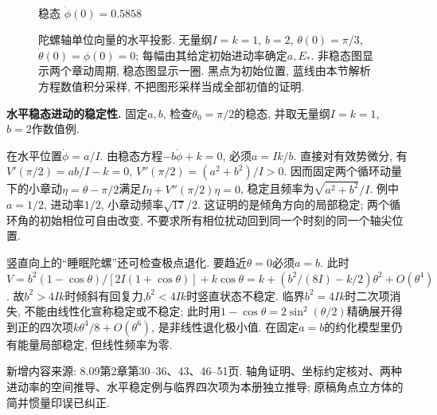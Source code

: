 \begin{figure}[htbp]
\begin{minipage}{.46\textwidth}
\\ 稳态 $\dot\phi(0)=0.5858$
\end{minipage}
\caption{陀螺轴单位向量的水平投影. 无量纲$I=k=1$, $b=2$, $\theta(0)=\pi/3$, $\dot\theta(0)=\phi(0)=0$; 每幅由其给定初始进动率确定$a,E_*$. 非稳态图显示两个章动周期, 稳态图显示一圈. 黑点为初始位置, 蓝线由本节解析方程数值积分采样, 不把图形采样当成全部初值的证明.}
\end{figure}

\begin{example}
\textbf{水平稳态进动的稳定性.} 
固定$a,b$, 检查$\theta_0=\pi/2$的稳态, 并取无量纲$I=k=1$, $b=2$作数值例.
\end{example}
\begin{solution}
在水平位置$\dot\phi=a/I$. 由稳态方程$-b\dot\phi+k=0$, 必须$a=Ik/b$. 直接对有效势微分, 有$V'(\pi/2)=ab/I-k=0$, $V''(\pi/2)=(a^2+b^2)/I>0$. 因而固定两个循环动量下的小章动$\eta=\theta-\pi/2$满足$I\ddot\eta+V''(\pi/2)\eta=0$, 稳定且频率为$\sqrt{a^2+b^2}/I$. 例中$a=1/2$, 进动率$1/2$, 小章动频率$\sqrt{17}/2$. 这证明的是倾角方向的局部稳定; 两个循环角的初始相位可自由改变, 不要求所有相位扰动回到同一个时刻的同一个轴尖位置.
\end{solution}

竖直向上的“睡眠陀螺”还可检查极点退化. 要趋近$\theta=0$必须$a=b$. 此时
$V=b^2(1-\cos\theta)/[2I(1+\cos\theta)]+k\cos\theta
=k+(b^2/(8I)-k/2)\theta^2+O(\theta^4)$.
故$b^2>4Ik$时倾斜有回复力,$b^2<4Ik$时竖直状态不稳定. 临界$b^2=4Ik$时二次项消失, 不能由线性化宣称稳定或不稳定; 此时用$1-\cos\theta=2\sin^2(\theta/2)$精确展开得到正的四次项$k\theta^4/8+O(\theta^6)$, 是非线性退化极小值. 在固定$a=b$的约化模型里仍有能量局部稳定, 但线性频率为零.

新增内容来源: 8.09第2章第30--36、43、46--51页. 轴角证明、坐标约定核对、两种进动率的空间推导、水平稳定例与临界四次项为本册独立推导; 原稿角点立方体的简并惯量印误已纠正.
